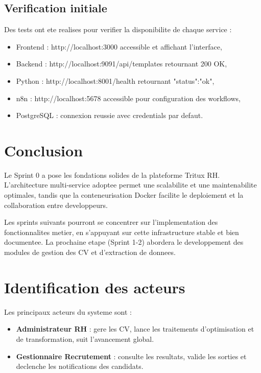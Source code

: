 \subsection{Verification initiale}

Des tests ont ete realises pour verifier la disponibilite de chaque service :

\begin{itemize}
    \item Frontend : http://localhost:3000 accessible et affichant l'interface,
    
    \item Backend : http://localhost:9091/api/templates retournant 200 OK,
    
    \item Python : http://localhost:8001/health retournant {"status":"ok"},
    
    \item n8n : http://localhost:5678 accessible pour configuration des workflows,
    
    \item PostgreSQL : connexion reussie avec credentials par defaut.
\end{itemize}

\section{Conclusion}

Le Sprint 0 a pose les fondations solides de la plateforme Tritux RH. L'architecture multi-service adoptee permet une scalabilite et une maintenabilite optimales, tandis que la conteneurisation Docker facilite le deploiement et la collaboration entre developpeurs.

Les sprints suivants pourront se concentrer sur l'implementation des fonctionnalites metier, en s'appuyant sur cette infrastructure stable et bien documentee. La prochaine etape (Sprint 1-2) abordera le developpement des modules de gestion des CV et d'extraction de donnees.

\section{Identification des acteurs}
Les principaux acteurs du systeme sont :
\begin{itemize}
    \item \textbf{Administrateur RH} : gere les CV, lance les traitements d'optimisation et de transformation, suit l'avancement global.
    \item \textbf{Gestionnaire Recrutement} : consulte les resultats, valide les sorties et declenche les notifications des candidats.
\end{itemize}

